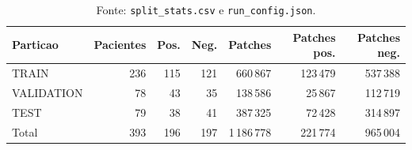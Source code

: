 \begin{table}[!htb]
\centering
\caption{Particionamento por paciente e volume de patches em DIAGSET.}
\label{tab:results_diagset-cohort}
\small
\begin{tabular}{lrrrrrr}
\toprule
Particao & Pacientes & Pos. & Neg. & Patches & Patches pos. & Patches neg. \\
\midrule
TRAIN & 236 & 115 & 121 & 660\,867 & 123\,479 & 537\,388 \\
VALIDATION & 78 & 43 & 35 & 138\,586 & 25\,867 & 112\,719 \\
TEST & 79 & 38 & 41 & 387\,325 & 72\,428 & 314\,897 \\
\midrule
Total & 393 & 196 & 197 & 1\,186\,778 & 221\,774 & 965\,004 \\
\bottomrule
\end{tabular}
\caption*{\footnotesize Fonte: \texttt{split\_stats.csv} e \texttt{run\_config.json}.}
\end{table}
